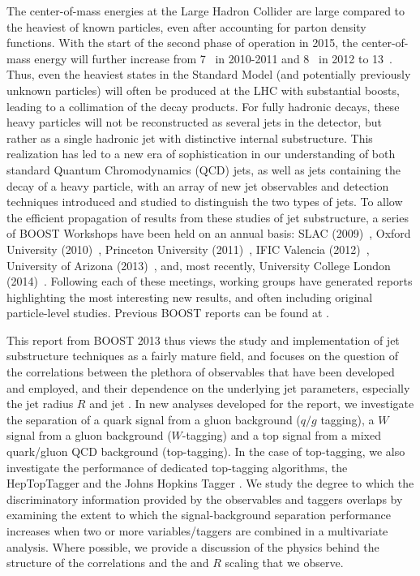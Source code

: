 The center-of-mass energies at the Large Hadron Collider are large compared to the heaviest of known particles, even after accounting for parton density functions. With the start of the second phase of operation in 2015, the center-of-mass energy will further increase from 7~\tev{} in 2010-2011 and 8~\tev{} in 2012 to 13~\tev{}. Thus, even the heaviest states in the Standard Model (and potentially previously unknown particles) will often be produced at the LHC with substantial boosts, leading to a collimation of the decay products.  For fully hadronic decays, these heavy particles will not be reconstructed as several jets in the detector, but rather as a single hadronic jet with distinctive internal substructure.  This realization has led to a new era of sophistication in our understanding of both standard Quantum Chromodynamics (QCD) jets, as well as jets containing the decay of a heavy particle, with an array of new jet observables and detection techniques introduced and studied to distinguish the two types of jets.  To allow the efficient propagation of  results from these studies of jet substructure, a series of BOOST Workshops have been held on an annual basis:
SLAC (2009)~\cite{Boost:2009xx},
Oxford University (2010)~\cite{Boost:2010xx},
Princeton University (2011)~\cite{Boost:2011xx},
IFIC Valencia (2012)~\cite{Boost:2012xx}, 
University of Arizona (2013)~\cite{Boost:2013xx},
and, most recently, University College London (2014)~\cite{Boost:2014xx}.
Following each of these meetings, working groups have generated reports
highlighting the most interesting new results, and often including original particle-level studies. Previous BOOST reports can be found at \cite{Abdesselam:2010pt,Altheimer:2012mn,Altheimer:2013yza}.

This report from BOOST 2013 thus views the study and implementation of jet substructure techniques as a fairly mature field, and focuses on the question of the correlations between the plethora of observables that have been developed and employed, and their dependence on the underlying jet parameters, especially the jet radius $R$ and jet \pt. In new analyses developed for the report, we investigate the separation of a quark signal from a gluon background ($q/g$ tagging), a $W$ signal from a gluon background ($W$-tagging) and a top signal from a mixed quark/gluon QCD background (top-tagging). In the case of top-tagging, we also investigate the performance of dedicated top-tagging algorithms, the HepTopTagger \cite{Plehn:2010st} and the Johns Hopkins Tagger \cite{Kaplan:2008ie}. We study the degree to which the discriminatory information provided by the observables and taggers overlaps by examining the extent to which the signal-background separation performance increases when two or more variables/taggers are combined in a multivariate analysis. Where possible, we provide a discussion of the physics behind the structure of the correlations and the \pt and $R$ scaling that we observe. 


